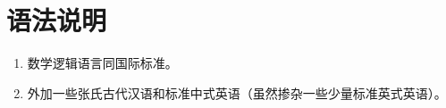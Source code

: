 \documentclass[lang=cn,10pt,device=pad]{elegantbook}
\begin{document}
\section{语法说明}
\begin{enumerate}
	\item 数学逻辑语言同国际标准。
	\item 外加一些张氏古代汉语和标准中式英语（虽然掺杂一些少量标准英式英语）。
\end{enumerate}
\end{document}
